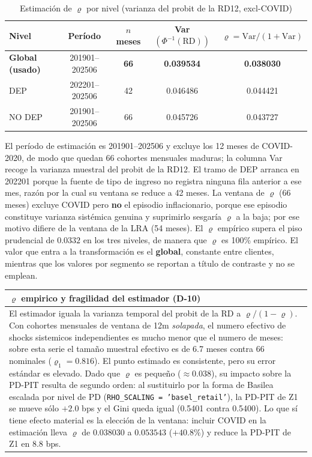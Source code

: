 \documentclass[12pt, a4paper]{article}
\newcommand{\RD}{\ensuremath{\mathrm{RD}}}
\renewcommand{\rho}{\ensuremath{\varrho}}
\newenvironment{recuadro}[1]
{\begin{center}\begin{tabular}{|p{0.92\textwidth}|}
\hline
\rowcolor{grissuave}
\textbf{#1} \\ \hline
}
{\\ \hline \end{tabular}\end{center}}
\begin{document}
\begin{table}[H]
\centering
\caption{Estimación de $\rho$ por nivel (varianza del probit de la RD12, excl-COVID)}
\label{tab:rho}
\small
\begin{tabular}{lcccc}
\toprule
\textbf{Nivel} & \textbf{Período} & \textbf{$n$ meses} & \textbf{Var$(\Phi^{-1}(\RD))$} & \textbf{$\rho=\mathrm{Var}/(1{+}\mathrm{Var})$} \\
\midrule
\textbf{Global (usado)} & 201901--202506 & \textbf{66} & \textbf{0.039534} & \textbf{0.038030} \\
DEP                     & 202201--202506 & 42          & 0.046486          & 0.044421 \\
NO DEP                  & 201901--202506 & 66          & 0.045726          & 0.043727 \\
\bottomrule
\end{tabular}
\end{table}
\noindent El período de estimación es 201901--202506 y excluye los 12 meses de COVID-2020, de modo
que quedan 66 cohortes mensuales maduras; la columna Var recoge la varianza muestral del probit de
la RD12. El tramo de DEP arranca en 202201 porque la fuente de tipo de ingreso no registra ninguna
fila anterior a ese mes, razón por la cual su ventana se reduce a 42 meses. La ventana de $\rho$
(66 meses) excluye COVID pero \textbf{no} el episodio inflacionario, porque ese episodio constituye
varianza sistémica genuina y suprimirlo sesgaría $\rho$ a la baja; por ese motivo difiere de la
ventana de la LRA (54 meses). El $\rho$ empírico supera el piso prudencial de $0.0332$ en los tres
niveles, de manera que $\rho$ es 100\% empírico. El valor que entra a la transformación es el
\textbf{global}, constante entre clientes, mientras que los valores por segmento se reportan a
título de contraste y no se emplean.

\begin{recuadro}{$\rho$ empirico y fragilidad del estimador (D-10)}
El estimador iguala la varianza temporal del probit de la RD a $\rho/(1-\rho)$. Con cohortes
mensuales de ventana de 12m \emph{solapada}, el numero efectivo de shocks sistemicos
independientes es mucho menor que el numero de meses: sobre esta serie el tamaño muestral efectivo
es de 6.7 meses contra 66 nominales ($\rho_1=0.816$). El punto estimado es consistente, pero su
error estándar es elevado. Dado que $\rho$ es pequeño ($\approx 0.038$), su impacto sobre la
PD-PIT resulta de segundo orden: al sustituirlo por la forma de Basilea escalada por nivel de PD
(\texttt{RHO\_SCALING = 'basel\_retail'}), la PD-PIT de Z1 se mueve sólo $+2.0$ bps y el Gini queda
igual (0.5401 contra 0.5400). Lo que sí tiene efecto material es la elección de la ventana: incluir
COVID en la estimación lleva $\rho$ de $0.038030$ a $0.053543$ ($+40.8\%$) y reduce la PD-PIT de Z1
en $8.8$ bps.
\end{recuadro}
\end{document}
